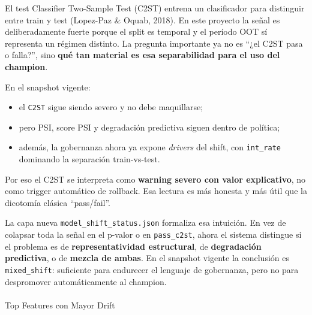 \documentclass[
  spanish,
  11pt,
  letterpaper,
]{scrbook}
\makeatletter
\let\oldparagraph\paragraph
\renewcommand{\paragraph}{
    \@ifstar
      \xxxParagraphStar
      \xxxParagraphNoStar
  }
\newcommand{\xxxParagraphStar}[1]{\oldparagraph*{#1}\mbox{}}
\newcommand{\xxxParagraphNoStar}[1]{\oldparagraph{#1}\mbox{}}
\providecommand{\tightlist}{%
  \setlength{\itemsep}{0pt}\setlength{\parskip}{0pt}}
\theoremstyle{plain}
\theoremstyle{remark}
\makeatother
\begin{document}
\begin{tcolorbox}[enhanced jigsaw, arc=.35mm, bottomrule=.15mm, bottomtitle=1mm, breakable, colback=white, colbacktitle=quarto-callout-tip-color!10!white, colframe=quarto-callout-tip-color-frame, coltitle=black, left=2mm, leftrule=.75mm, opacityback=0, opacitybacktitle=0.6, rightrule=.15mm, title=\textcolor{quarto-callout-tip-color}{\faLightbulb}\hspace{0.5em}{El caso especial del C2ST}, titlerule=0mm, toprule=.15mm, toptitle=1mm]

El test Classifier Two-Sample Test (C2ST) entrena un clasificador para
distinguir entre train y test (Lopez-Paz \& Oquab, 2018). En este
proyecto la señal es deliberadamente fuerte porque el split es temporal
y el período OOT sí representa un régimen distinto. La pregunta
importante ya no es ``¿el C2ST pasa o falla?'', sino \textbf{qué tan
material es esa separabilidad para el uso del champion}.

En el snapshot vigente:

\begin{itemize}
\tightlist
\item
  el \texttt{C2ST} sigue siendo severo y no debe maquillarse;
\item
  pero PSI, score PSI y degradación predictiva siguen dentro de
  política;
\item
  además, la gobernanza ahora ya expone \emph{drivers} del shift, con
  \texttt{int\_rate} dominando la separación train-vs-test.
\end{itemize}

Por eso el C2ST se interpreta como \textbf{warning severo con valor
explicativo}, no como trigger automático de rollback. Esa lectura es más
honesta y más útil que la dicotomía clásica ``pass/fail''.

La capa nueva \texttt{model\_shift\_status.json} formaliza esa
intuición. En vez de colapsar toda la señal en el p-valor o en
\texttt{pass\_c2st}, ahora el sistema distingue si el problema es de
\textbf{representatividad estructural}, de \textbf{degradación
predictiva}, o de \textbf{mezcla de ambas}. En el snapshot vigente la
conclusión es \texttt{mixed\_shift}: suficiente para endurecer el
lenguaje de gobernanza, pero no para despromover automáticamente al
champion.

\end{tcolorbox}

\paragraph{Top Features con Mayor
Drift}\label{top-features-con-mayor-drift}
\end{document}
